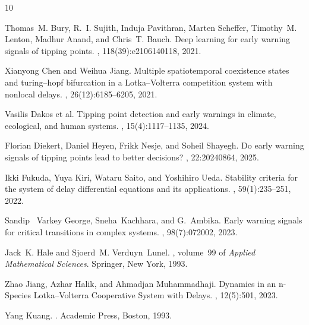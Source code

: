 \documentclass[11pt]{article}
\begin{document}
\begin{thebibliography}{10}
	
	 
	
	Thomas~M. Bury, R.~I. Sujith, Induja Pavithran, Marten Scheffer, Timothy~M.
	Lenton, Madhur Anand, and Chris~T. Bauch.
	\newblock Deep learning for early warning signals of tipping points.
	,
	118(39):e2106140118, 2021.
	
	Xianyong Chen and Weihua Jiang.
	\newblock Multiple spatiotemporal coexistence states and turing--hopf
	bifurcation in a Lotka--Volterra competition system with nonlocal delays.
	,
	26(12):6185--6205, 2021.
	
	Vasilis Dakos et al.
	\newblock Tipping point detection and early warnings in climate, ecological,
	and human systems.
	, 15(4):1117--1135, 2024.
	
	Florian Diekert, Daniel Heyen, Frikk Nesje, and Soheil Shayegh.
	\newblock Do early warning signals of tipping points lead to better decisions?
	, 22:20240864, 2025.
	
	
	Ikki Fukuda, Yuya Kiri, Wataru Saito, and Yoshihiro Ueda.
	\newblock Stability criteria for the system of delay differential equations and
	its applications.
	, 59(1):235--251, 2022.
	
	Sandip ~Varkey  George, Sneha~Kachhara, and G.~Ambika.
	\newblock Early warning signals for critical transitions in complex systems.
	,
	98(7):072002, 2023.
	
	Jack~K. Hale and Sjoerd~M. Verduyn~Lunel.
	, volume~99 of
	{\em Applied Mathematical Sciences}.
	\newblock Springer, New York, 1993.
	
	Zhao Jiang, Azhar Halik, and Ahmadjan Muhammadhaji.
	\newblock Dynamics in an n-Species Lotka--Volterra Cooperative System with
	Delays.
	, 12(5):501, 2023.
	
	Yang Kuang.
	.
	\newblock Academic Press, Boston, 1993.
	

\end{thebibliography}
\end{document}
